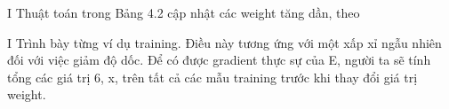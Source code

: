 I Thuật toán trong Bảng 4.2 cập nhật các weight tăng dần, theo

I Trình bày từng ví dụ training. Điều này tương ứng với một xấp xỉ ngẫu nhiên đối với việc giảm độ dốc. Để có được gradient thực sự của E, người ta sẽ tính tổng các giá trị 6, x, trên tất cả các mẫu training trước khi thay đổi giá trị weight.

